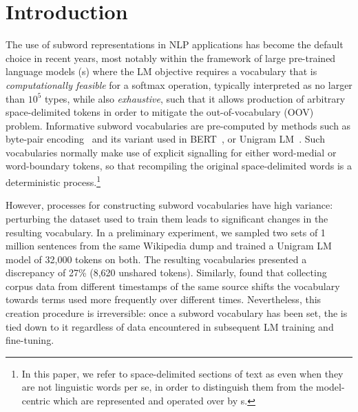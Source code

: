 \section{Introduction}
\label{sec:intro}

The use of subword representations in NLP applications has become the default choice in recent years, most notably within the framework of large pre-trained language models (\llm{}s) where the LM objective requires a vocabulary that is \textit{computationally feasible} for a softmax operation, typically interpreted as no larger than $10^{5}$ types, while also \textit{exhaustive}, such that it allows production of arbitrary space-delimited tokens in order to mitigate the out-of-vocabulary (OOV) problem.
Informative subword vocabularies are pre-computed by methods such as byte-pair encoding~\cite[BPE;][]{sennrich-etal-2016-neural} and its variant \wpc{} used in BERT~\cite{devlin-etal-2019-bert}, or Unigram LM~\cite{kudo-2018-subword}.
Such vocabularies normally make use of explicit signalling for either word-medial or word-boundary tokens, so that recompiling the original space-delimited words is a deterministic process.\footnote{In this paper, we refer to space-delimited sections of text as  even when they are not linguistic words per se, in order to distinguish them from the model-centric  which are represented and operated over by \llm{}s.}



However, processes for constructing subword vocabularies have high variance: perturbing the dataset used to train them leads to significant changes in the resulting vocabulary.
In a preliminary experiment, we sampled two sets of 1 million sentences from the same Wikipedia dump and trained a Unigram LM model of 32,000 tokens on both.
The resulting vocabularies presented a discrepancy of 27\% (8,620 unshared tokens).
Similarly,  found that collecting corpus data from different timestamps of the same source shifts the vocabulary towards terms used more frequently over different times.
Nevertheless, this creation procedure is irreversible: once a subword vocabulary has been set, the \llm{} is tied down to it regardless of data encountered in subsequent LM training and fine-tuning.



